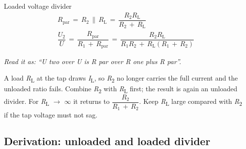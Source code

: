 \documentclass[11pt]{article}
\begin{document}
\begin{keepsection}
\begin{keepsection}
\begin{equationcard}{Loaded voltage divider}
\[ \begin{gathered} {R}_{\text{par}}\, =\, {R}_{2}\, \parallel \, {R}_{\mathrm{L}}\, =\, \dfrac{{R}_{2}{R}_{\mathrm{L}}}{{R}_{2}\, +\, {R}_{\mathrm{L}}} \\ \dfrac{{U}_{2}}{{U}}\, =\, \dfrac{{R}_{\text{par}}}{{R}_{1}\, +\, {R}_{\text{par}}}\, =\, \dfrac{{R}_{2}{R}_{\mathrm{L}}}{{R}_{1}{R}_{2}\, +\, {R}_{\mathrm{L}}({R}_{1}\, +\, {R}_{2})} \end{gathered} \]
{\small \emph{Read it as: “U two over U is R par over R one plus R par”.}\par A load \textit{R}\textsubscript{L} at the tap draws \textit{I}\textsubscript{L}, so \textit{R}\textsubscript{2} no longer carries the full current and the unloaded ratio fails. Combine \textit{R}\textsubscript{2} with \textit{R}\textsubscript{L} first; the result is again an unloaded divider. For \textit{R}\textsubscript{L} \ensuremath{\to} \ensuremath{\infty} it returns to {\small\ensuremath{\dfrac{{R}_{2}}{{R}_{1}\, +\, {R}_{2}}}}. Keep \textit{R}\textsubscript{L} large compared with \textit{R}\textsubscript{2} if the tap voltage must not sag.}
\end{equationcard}
\end{keepsection}

\begin{keepsection}
\subsection{Derivation: unloaded and loaded divider}


\end{keepsection}
\end{keepsection}
\end{document}
